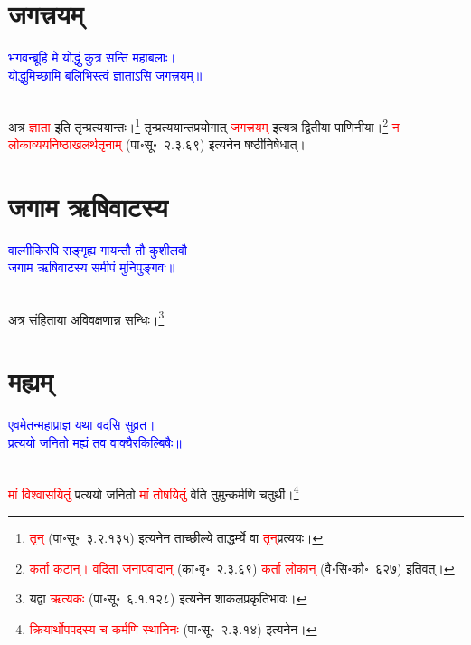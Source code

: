 \section[जगत्त्रयम्]{जगत्त्रयम्‌}
\centering\textcolor{blue}{भगवन्ब्रूहि मे योद्धुं कुत्र सन्ति महाबलाः।\nopagebreak\\
योद्धुमिच्छामि बलिभिस्त्वं ज्ञाताऽसि जगत्त्रयम्॥}\nopagebreak\\
\\
\begin{sloppypar}\justifying\noindent\hspace{10mm} अत्र \textcolor{red}{ज्ञाता} इति तृन्प्रत्ययान्तः।\footnote{\textcolor{red}{तृन्} (पा॰सू॰~३.२.१३५) इत्यनेन ताच्छील्ये ताद्धर्म्ये वा \textcolor{red}{तृन्‌}\-प्रत्ययः।} तृन्प्रत्ययान्त\-प्रयोगात् \textcolor{red}{जगत्त्रयम्‌} इत्यत्र द्वितीया पाणिनीया।\footnote{\textcolor{red}{कर्ता कटान्। वदिता जनापवादान्} (का॰वृ॰~२.३.६९) \textcolor{red}{कर्ता लोकान्} (वै॰सि॰कौ॰~६२७) इतिवत्।} \textcolor{red}{न लोकाव्यय\-निष्ठा\-खलर्थ\-तृनाम्‌} (पा॰सू॰~२.३.६९) इत्यनेन षष्ठी\-निषेधात्।\end{sloppypar}
\section[जगाम ऋषिवाटस्य]{जगाम ऋषिवाटस्य}
\centering\textcolor{blue}{वाल्मीकिरपि सङ्गृह्य गायन्तौ तौ कुशीलवौ।\nopagebreak\\
जगाम ऋषिवाटस्य समीपं मुनिपुङ्गवः॥}\nopagebreak\\
\\
\begin{sloppypar}\justifying\noindent\hspace{10mm} अत्र संहिताया अविवक्षणान्न सन्धिः।\footnote{यद्वा \textcolor{red}{ऋत्यकः} (पा॰सू॰~६.१.१२८) इत्यनेन शाकल\-प्रकृति\-भावः।}\end{sloppypar}
\section[मह्यम्]{मह्यम्‌}
\centering\textcolor{blue}{एवमेतन्महाप्राज्ञ यथा वदसि सुव्रत।\nopagebreak\\
प्रत्ययो जनितो मह्यं तव वाक्यैरकिल्बिषैः॥}\nopagebreak\\
\\
\begin{sloppypar}\justifying\noindent\hspace{10mm} \textcolor{red}{मां विश्वासयितुं} प्रत्ययो जनितो \textcolor{red}{मां तोषयितुं} वेति तुमुन्कर्मणि चतुर्थी।\footnote{\textcolor{red}{क्रियार्थोपपदस्य च कर्मणि स्थानिनः} (पा॰सू॰~२.३.१४) इत्यनेन।}\end{sloppypar}
